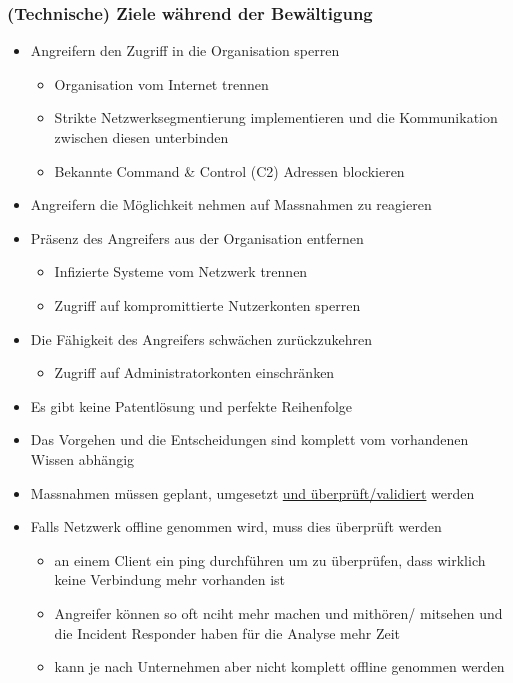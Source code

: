\subsubsection{(Technische) Ziele während der Bewältigung}
\begin{itemize}
    \item Angreifern den Zugriff in die Organisation sperren
    \begin{itemize}
        \item Organisation vom Internet trennen
        \item Strikte Netzwerksegmentierung implementieren und die Kommunikation zwischen diesen unterbinden
        \item Bekannte Command \& Control (C2) Adressen blockieren
    \end{itemize}
    \item Angreifern die Möglichkeit nehmen auf Massnahmen zu reagieren
    \item Präsenz des Angreifers aus der Organisation entfernen
    \begin{itemize}
        \item Infizierte Systeme vom Netzwerk trennen
        \item Zugriff auf kompromittierte Nutzerkonten sperren
    \end{itemize}
    \item Die Fähigkeit des Angreifers schwächen zurückzukehren
    \begin{itemize}
        \item Zugriff auf Administratorkonten einschränken
    \end{itemize}
    \item Es gibt keine Patentlösung und perfekte Reihenfolge
    \item Das Vorgehen und die Entscheidungen sind komplett vom vorhandenen Wissen abhängig
    \item Massnahmen müssen geplant, umgesetzt \underline{und überprüft/validiert} werden
    \item Falls Netzwerk offline genommen wird, muss dies überprüft werden
    \begin{itemize}
        \item an einem Client ein ping durchführen um zu überprüfen, dass wirklich keine Verbindung mehr vorhanden ist
        \item Angreifer können so oft nciht mehr machen und mithören/ mitsehen und die Incident Responder haben für die Analyse mehr Zeit
        \item kann je nach Unternehmen aber nicht komplett offline genommen werden
    \end{itemize}
\end{itemize}


